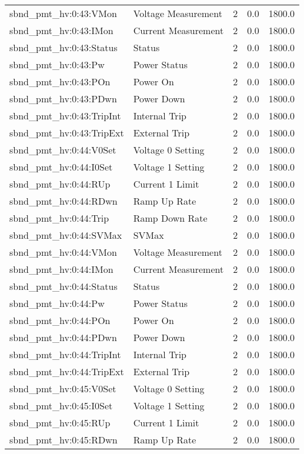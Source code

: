 \begin{center}
\begin{longtable}{l | l l l l }
sbnd\_pmt\_hv:0:43:VMon & Voltage Measurement & 2 & 0.0 & 1800.0\\ 
sbnd\_pmt\_hv:0:43:IMon & Current Measurement & 2 & 0.0 & 1800.0\\ 
sbnd\_pmt\_hv:0:43:Status & Status & 2 & 0.0 & 1800.0\\ 
sbnd\_pmt\_hv:0:43:Pw & Power Status & 2 & 0.0 & 1800.0\\ 
sbnd\_pmt\_hv:0:43:POn & Power On & 2 & 0.0 & 1800.0\\ 
sbnd\_pmt\_hv:0:43:PDwn & Power Down & 2 & 0.0 & 1800.0\\ 
sbnd\_pmt\_hv:0:43:TripInt & Internal Trip & 2 & 0.0 & 1800.0\\ 
sbnd\_pmt\_hv:0:43:TripExt & External Trip & 2 & 0.0 & 1800.0\\ 
sbnd\_pmt\_hv:0:44:V0Set & Voltage 0 Setting & 2 & 0.0 & 1800.0\\ 
sbnd\_pmt\_hv:0:44:I0Set & Voltage 1 Setting & 2 & 0.0 & 1800.0\\ 
sbnd\_pmt\_hv:0:44:RUp & Current 1 Limit & 2 & 0.0 & 1800.0\\ 
sbnd\_pmt\_hv:0:44:RDwn & Ramp Up Rate & 2 & 0.0 & 1800.0\\ 
sbnd\_pmt\_hv:0:44:Trip & Ramp Down Rate & 2 & 0.0 & 1800.0\\ 
sbnd\_pmt\_hv:0:44:SVMax & SVMax & 2 & 0.0 & 1800.0\\ 
sbnd\_pmt\_hv:0:44:VMon & Voltage Measurement & 2 & 0.0 & 1800.0\\ 
sbnd\_pmt\_hv:0:44:IMon & Current Measurement & 2 & 0.0 & 1800.0\\ 
sbnd\_pmt\_hv:0:44:Status & Status & 2 & 0.0 & 1800.0\\ 
sbnd\_pmt\_hv:0:44:Pw & Power Status & 2 & 0.0 & 1800.0\\ 
sbnd\_pmt\_hv:0:44:POn & Power On & 2 & 0.0 & 1800.0\\ 
sbnd\_pmt\_hv:0:44:PDwn & Power Down & 2 & 0.0 & 1800.0\\ 
sbnd\_pmt\_hv:0:44:TripInt & Internal Trip & 2 & 0.0 & 1800.0\\ 
sbnd\_pmt\_hv:0:44:TripExt & External Trip & 2 & 0.0 & 1800.0\\ 
sbnd\_pmt\_hv:0:45:V0Set & Voltage 0 Setting & 2 & 0.0 & 1800.0\\ 
sbnd\_pmt\_hv:0:45:I0Set & Voltage 1 Setting & 2 & 0.0 & 1800.0\\ 
sbnd\_pmt\_hv:0:45:RUp & Current 1 Limit & 2 & 0.0 & 1800.0\\ 
sbnd\_pmt\_hv:0:45:RDwn & Ramp Up Rate & 2 & 0.0 & 1800.0\\ 

\end{longtable}
\end{center}
